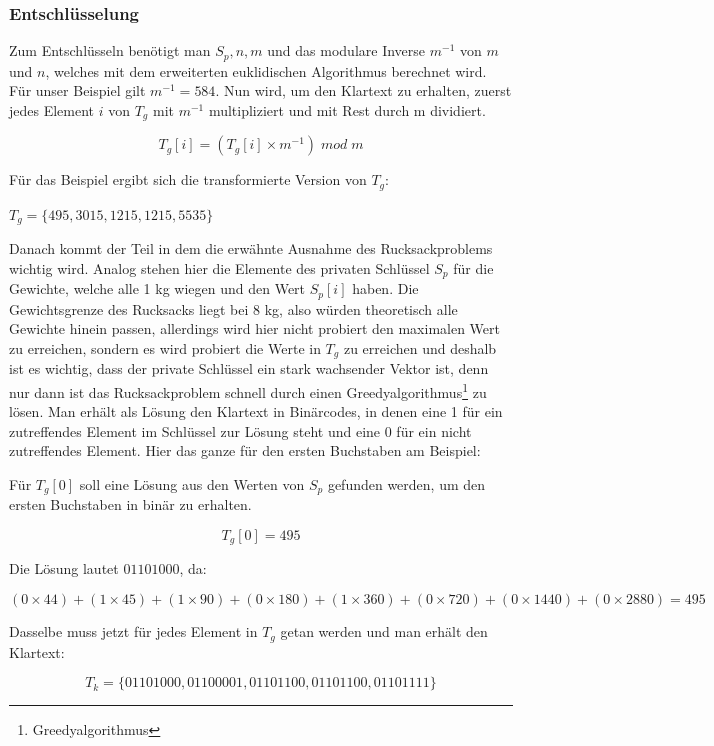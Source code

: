 \documentclass[a4paper,12pt,titlepage]{article}
\begin{document}
\subsubsection{Entschlüsselung}
Zum Entschlüsseln benötigt man $S_p,n,m$ und das modulare Inverse $m^{-1}$ von $m$ und $n$, welches mit dem erweiterten euklidischen Algorithmus berechnet wird.
Für unser Beispiel gilt $m^{-1} = 584$.
Nun wird, um den Klartext zu erhalten, zuerst jedes Element $i$ von $T_g$ mit $m^{-1}$ multipliziert und mit Rest durch m dividiert.
\begin{center}
\[T_g[i] = (T_g[i] \times m^{-1})\; mod \; m\]
\end{center}
Für das Beispiel ergibt sich die transformierte Version von $T_g$:
\begin{center}
$T_g=\{495,3015,1215,1215,5535\}$
\end{center}
Danach kommt der Teil in dem die erwähnte Ausnahme des Rucksackproblems wichtig wird.
Analog stehen hier die Elemente des privaten Schlüssel $S_p$ für die Gewichte, welche alle 1 kg wiegen und den Wert $S_p[i]$ haben. Die Gewichtsgrenze des Rucksacks liegt bei 8 kg, also würden theoretisch alle Gewichte hinein passen, allerdings wird hier nicht probiert den maximalen Wert zu erreichen, sondern es wird probiert die Werte in $T_g$ zu erreichen und deshalb ist es wichtig, dass der private Schlüssel ein stark wachsender Vektor ist, denn nur dann ist das Rucksackproblem schnell durch einen Greedyalgorithmus\footnote{Greedyalgorithmus} zu lösen. Man erhält als Lösung den Klartext in Binärcodes, in denen eine 1 für ein zutreffendes Element im Schlüssel zur Lösung steht und eine 0 für ein nicht zutreffendes Element. \newline Hier das ganze für den ersten Buchstaben am Beispiel:
\begin{center}
\begin{flushleft}
Für $T_g[0]$ soll eine Lösung aus den Werten von $S_p$ gefunden werden, um den ersten Buchstaben in binär zu erhalten.
\end{flushleft}
\[T_g[0] = 495\]
\begin{flushleft}
Die Lösung lautet $01101000$, da:
\end{flushleft}
\[(0 \times 44) + (1 \times 45) + (1 \times 90) + (0 \times 180) + (1 \times 360)  + (0 \times 720 )+ (0 \times 1440 )+ (0 \times 2880) = 495\]

\begin{flushleft}
Dasselbe muss jetzt für jedes Element in $T_g$ getan werden und man erhält den Klartext:
\end{flushleft}

\[T_k = \{01101000, 01100001, 01101100, 01101100, 01101111\}\]

\end{center}
\end{document}
